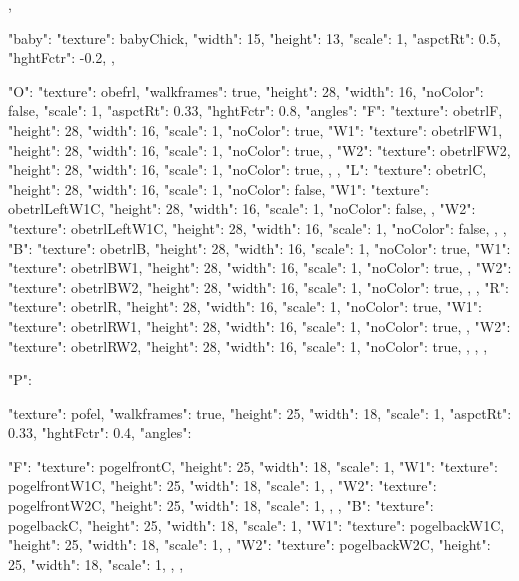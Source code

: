 {{{    }
  },

  "baby": {
    "texture": babyChick,
    "width": 15,
    "height": 13,
    "scale": 1,
    "aspctRt": 0.5,
    "hghtFctr": -0.2,
  },

  "O": {
    "texture": obefrl,
    "walkframes": true,
    "height": 28,
    "width": 16,
    "noColor": false,
    "scale": 1,
    "aspctRt": 0.33,
    "hghtFctr": 0.8,
    "angles":{
      "F": {
        "texture": obetrlF,
        "height": 28,
        "width": 16,
        "scale": 1,
        "noColor": true,
        "W1": {
          "texture": obetrlFW1,
          "height": 28,
          "width": 16,
          "scale": 1,
          "noColor": true,
        },
        "W2": {
          "texture": obetrlFW2,
          "height": 28,
          "width": 16,
          "scale": 1,
          "noColor": true,
        },
      },
      "L": {
        "texture": obetrlC,
        "height": 28,
        "width": 16,
        "scale": 1,
        "noColor": false,
        "W1": {
          "texture": obetrlLeftW1C,
          "height": 28,
          "width": 16,
          "scale": 1,
          "noColor": false,
        },
        "W2": {
          "texture": obetrlLeftW1C,
          "height": 28,
          "width": 16,
          "scale": 1,
          "noColor": false,
        },
      },
      "B": {
        "texture": obetrlB,
        "height": 28,
        "width": 16,
        "scale": 1,
        "noColor": true,
        "W1": {
          "texture": obetrlBW1,
          "height": 28,
          "width": 16,
          "scale": 1,
          "noColor": true,
        },
        "W2": {
          "texture": obetrlBW2,
          "height": 28,
          "width": 16,
          "scale": 1,
          "noColor": true,
        },
      },
      "R": {
        "texture": obetrlR,
        "height": 28,
        "width": 16,
        "scale": 1,
        "noColor": true,
        "W1": {
          "texture": obetrlRW1,
          "height": 28,
          "width": 16,
          "scale": 1,
          "noColor": true,
        },
        "W2": {
          "texture": obetrlRW2,
          "height": 28,
          "width": 16,
          "scale": 1,
          "noColor": true,
        },
      },
    }
  },

  "P": {
    "texture": pofel,
    "walkframes": true,
    "height": 25,
    "width": 18,
    "scale": 1,
    "aspctRt": 0.33,
    "hghtFctr": 0.4,
    "angles":{
      "F": {
        "texture": pogelfrontC,
        "height": 25,
        "width": 18,
        "scale": 1,
        "W1": {
          "texture": pogelfrontW1C,
          "height": 25,
          "width": 18,
          "scale": 1,
        },
        "W2": {
          "texture": pogelfrontW2C,
          "height": 25,
          "width": 18,
          "scale": 1,
        },
      },
      "B": {
        "texture": pogelbackC,
        "height": 25,
        "width": 18,
        "scale": 1,
        "W1": {
          "texture": pogelbackW1C,
          "height": 25,
          "width": 18,
          "scale": 1,
        },
        "W2": {
          "texture": pogelbackW2C,
          "height": 25,
          "width": 18,
          "scale": 1,
        },
      },

}}}
